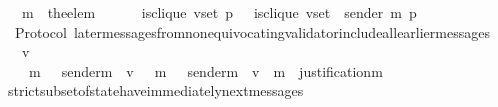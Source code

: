 \begin{isabellebody}
\ \ {\isasymlongrightarrow}\ m{\isacharprime}\ {\isacharequal}\ the{\isacharunderscore}elem\ {\isacharparenleft}{\isasymsigma}{\isacharprime}\ {\isacharminus}\ {\isasymsigma}{\isacharparenright}\isanewline
\ \ {\isasymlongrightarrow}\ is{\isacharunderscore}clique\ {\isacharparenleft}v{\isacharunderscore}set{\isacharcomma}\ p{\isacharcomma}\ {\isasymsigma}{\isacharparenright}\ {\isacharequal}\ is{\isacharunderscore}clique\ {\isacharparenleft}v{\isacharunderscore}set\ {\isacharminus}\ {\isacharbraceleft}sender\ m{\isacharprime}{\isacharbraceright}{\isacharcomma}\ p{\isacharcomma}\ {\isasymsigma}{\isacharprime}{\isacharparenright}{\isachardoublequoteclose}\isanewline
%
\isadelimproof
\ \ %
\endisadelimproof
%
\isatagproof
{}\isamarkupfalse%
%
\endisatagproof
{\isafoldproof}%
%
\isadelimproof
\isanewline
%
\endisadelimproof
\isanewline
\isanewline
\isanewline
\isanewline
{}\isamarkupfalse%
\ {\isacharparenleft}\ Protocol{\isacharparenright}\ later{\isacharunderscore}messages{\isacharunderscore}from{\isacharunderscore}non{\isacharunderscore}equivocating{\isacharunderscore}validator{\isacharunderscore}include{\isacharunderscore}all{\isacharunderscore}earlier{\isacharunderscore}messages\ {\isacharcolon}\isanewline
\ \ {\isachardoublequoteopen}{\isasymforall}\ v\ {\isasymsigma}\ {\isasymsigma}{}\ {\isasymsigma}{}{\isachardot}\ {\isasymsigma}\ {\isasymin}\ {\isasymSigma}\ {\isasymand}\ {\isasymsigma}{}\ {\isasymin}\ {\isasymSigma}\ {\isasymand}\ {\isasymsigma}{}\ {\isasymsubseteq}\ {\isasymsigma}\ {\isasymand}\ {\isasymsigma}{}\ {\isasymsubseteq}\ {\isasymsigma}\ {\isasymand}\ {\isasymsigma}{}\ {\isasyminter}\ {\isasymsigma}{}\ {\isacharequal}\ {\isasymemptyset}\isanewline
\ \ {\isasymlongrightarrow}\ {\isacharparenleft}{\isasymforall}\ m{}\ {\isasymin}\ {\isasymsigma}{}{\isachardot}\ sender{\isacharparenleft}m{}{\isacharparenright}\ {\isacharequal}\ v\ {\isasymlongrightarrow}\ {\isacharparenleft}{\isasymforall}\ m{}\ {\isasymin}\ {\isasymsigma}{}{\isachardot}\ sender{\isacharparenleft}m{}{\isacharparenright}\ {\isacharequal}\ v\ {\isasymlongrightarrow}\ m{}\ {\isasymin}\ justification{\isacharparenleft}m{}{\isacharparenright}{\isacharparenright}{\isacharparenright}{\isachardoublequoteclose}\isanewline
%
\isadelimproof
\ \ %
\endisadelimproof
%
\isatagproof
{}\isamarkupfalse%
\ strict{\isacharunderscore}subset{\isacharunderscore}of{\isacharunderscore}state{\isacharunderscore}have{\isacharunderscore}immediately{\isacharunderscore}next{\isacharunderscore}messages\isanewline

\end{isabellebody}
